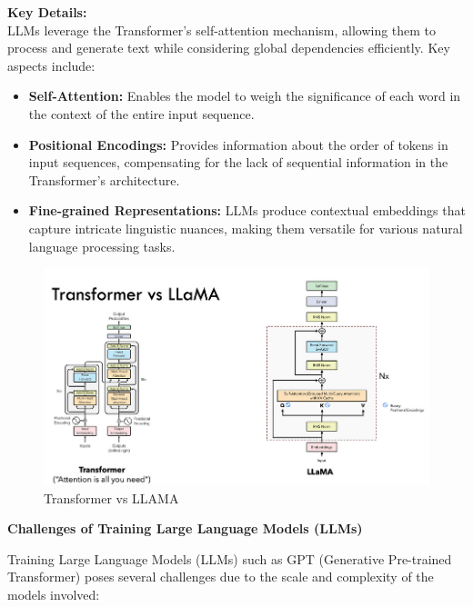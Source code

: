\hfill \break
\textbf{Key Details:} \\

LLMs leverage the Transformer's self-attention mechanism, allowing them to process and generate text while considering global dependencies efficiently. Key aspects include:

\begin{itemize}
    \item \textbf{Self-Attention:} Enables the model to weigh the significance of each word in the context of the entire input sequence.
    
    \item \textbf{Positional Encodings:} Provides information about the order of tokens in input sequences, compensating for the lack of sequential information in the Transformer's architecture.
    
    \item \textbf{Fine-grained Representations:} LLMs produce contextual embeddings that capture intricate linguistic nuances, making them versatile for various natural language processing tasks.
\end{itemize}

\begin{figure}[h!]
	\centering
	\includegraphics[scale=0.5]{figures/llama.png}
	\caption{Transformer vs LLAMA }
\end{figure}

\hfill \break
\textbf{Challenges of Training Large Language Models (LLMs)}

Training Large Language Models (LLMs) such as GPT (Generative Pre-trained Transformer) poses several challenges due to the scale and complexity of the models involved:

